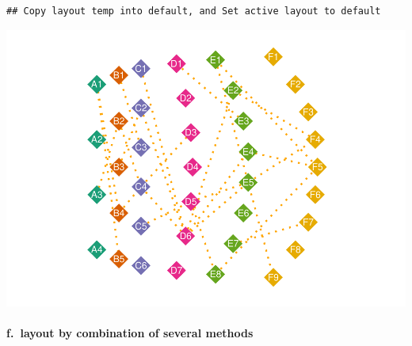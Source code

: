 \documentclass[
]{article}
\let\oldparagraph\paragraph
\renewcommand{\paragraph}[1]{\oldparagraph{#1}\mbox{}}
\begin{document}
\begin{verbatim}
## Copy layout temp into default, and Set active layout to default
\end{verbatim}

\includegraphics{ReadMe1_files/figure-latex/unnamed-chunk-15-1.pdf}

\hypertarget{f.-layout-by-combination-of-several-methods}{%
\paragraph{f.~layout by combination of several
methods}\label{f.-layout-by-combination-of-several-methods}}
\end{document}
